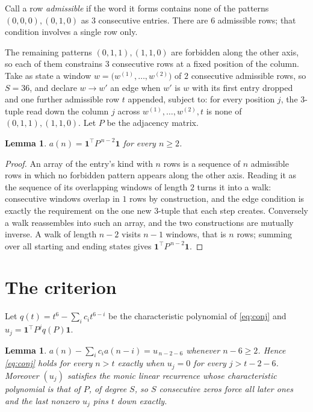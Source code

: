\documentclass[11pt,a4paper]{article}
\theoremstyle{plain}
\newtheorem{lemma}[theorem]{Lemma}
\theoremstyle{definition}
\begin{document}
Call a row \emph{admissible} if the word it forms contains none of the patterns
$(0,0,0), (0,1,0)$ as $3$ consecutive entries. There are $6$ admissible rows; that condition
involves a single row only.

The remaining patterns $(0,1,1), (1,1,0)$ are forbidden along the other axis, so each of them
constrains $3$ consecutive rows at a fixed position of the column. Take as state a
window $w=\bigl(w^{(1)},\dots,w^{(2)}\bigr)$ of $2$ consecutive admissible
rows, so $S=36$, and declare $w\to w'$ an edge when $w'$ is $w$ with its first entry
dropped and one further admissible row $t$ appended, subject to: for every position
$j$, the $3$-tuple read down the column $j$ across $w^{(1)},\dots,w^{(2)},t$
is none of $(0,1,1), (1,1,0)$. Let $P$ be the adjacency matrix.

\begin{lemma}\label{lem:walk}
$a(n)=\mathbf{1}^{\!\top}P^{\,n-2}\mathbf{1}$ for every $n\ge2$.
\end{lemma}

\begin{proof}
An array of the entry's kind with $n$ rows is a sequence of $n$ admissible rows in
which no forbidden pattern appears along the other axis. Reading it as the sequence of its
overlapping windows of length $2$ turns it into a walk: consecutive windows overlap in
$1$ rows by construction, and the edge condition is exactly the requirement on the one
new $3$-tuple that each step creates. Conversely a walk reassembles into such an array,
and the two constructions are mutually inverse. A walk of length $n-2$ visits $n-1$
windows, that is $n$ rows; summing over all starting and ending states gives
$\mathbf{1}^{\!\top}P^{\,n-2}\mathbf{1}$.
\end{proof}

\section{The criterion}

Let $q(t)=t^{6}-\sum_i c_i t^{6-i}$ be the characteristic polynomial of
\eqref{eq:conj} and $u_j=\mathbf{1}^{\!\top}P^{j}q(P)\mathbf{1}$.

\begin{lemma}\label{lem:crit}
$a(n)-\sum_i c_i a(n-i)=u_{\,n-2-6}$ whenever $n-6\ge2$. Hence
\eqref{eq:conj} holds for every $n>t$ exactly when $u_j=0$ for every
$j>t-2-6$. Moreover $(u_j)$ satisfies the monic linear recurrence whose
characteristic polynomial is that of $P$, of degree $S$, so $S$ consecutive zeros force all
later ones and the last nonzero $u_j$ pins $t$ down exactly.
\end{lemma}
\end{document}
